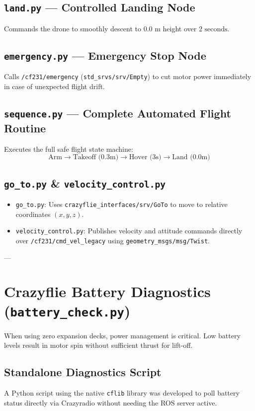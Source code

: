 \documentclass[11pt,a4paper]{article}
\begin{document}
\subsection{\texttt{land.py} — Controlled Landing Node}
Commands the drone to smoothly descent to $0.0\text{ m}$ height over $2\text{ seconds}$.

\subsection{\texttt{emergency.py} — Emergency Stop Node}
Calls \texttt{/cf231/emergency} (\texttt{std\_srvs/srv/Empty}) to cut motor power immediately in case of unexpected flight drift.

\subsection{\texttt{sequence.py} — Complete Automated Flight Routine}
Executes the full safe flight state machine:
$$\text{Arm} \longrightarrow \text{Takeoff (0.3m)} \longrightarrow \text{Hover (3s)} \longrightarrow \text{Land (0.0m)}$$

\subsection{\texttt{go\_to.py} \& \texttt{velocity_control.py}}
\begin{itemize}
    \item \texttt{go\_to.py}: Uses \texttt{crazyflie\_interfaces/srv/GoTo} to move to relative coordinates $(x, y, z)$.
    \item \texttt{velocity\_control.py}: Publishes velocity and attitude commands directly over \texttt{/cf231/cmd\_vel_legacy} using \texttt{geometry\_msgs/msg/Twist}.
\end{itemize}

---

\section{Crazyflie Battery Diagnostics (\texttt{battery\_check.py})}
When using zero expansion decks, power management is critical. Low battery levels result in motor spin without sufficient thrust for lift-off.

\subsection{Standalone Diagnostics Script}
A Python script using the native \texttt{cflib} library was developed to poll battery status directly via Crazyradio without needing the ROS server active.
\end{document}
